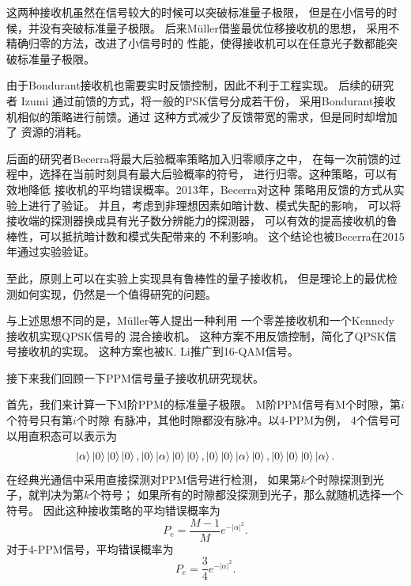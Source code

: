 这两种接收机虽然在信号较大的时候可以突破标准量子极限，
但是在小信号的时候，并没有突破标准量子极限。
后来M{\"u}ller借鉴最优位移接收机的思想，
采用不精确归零的方法，改进了小信号时的
性能，使得接收机可以在任意光子数都能突破标准量子极限\cite{muller2014qpsk,muller2014m}。

由于Bondurant接收机也需要实时反馈控制，因此不利于工程实现。
后续的研究者 Izumi 通过前馈的方式，将一般的PSK信号分成若干份，
采用Bondurant接收机相似的策略进行前馈\cite{izumi2012displacement}。通过
这种方式减少了反馈带宽的需求，但是同时却增加了
资源的消耗。

后面的研究者Becerra将最大后验概率策略加入归零顺序之中，
在每一次前馈的过程中，选择在当前时刻具有最大后验概率的符号，
进行归零\cite{becerra2011m}。这种策略，可以有效地降低
接收机的平均错误概率。2013年，Becerra对这种
策略用反馈的方式从实验上进行了验证\cite{becerra2013experimental}。
并且，考虑到非理想因素如暗计数、模式失配的影响，
可以将接收端的探测器换成具有光子数分辨能力的探测器，
可以有效的提高接收机的鲁棒性，可以抵抗暗计数和模式失配带来的
不利影响\cite{izumi2013quantum,li2013suppressing}。
这个结论也被Becerra在2015年通过实验验证\cite{becerra2015photon}。

至此，原则上可以在实验上实现具有鲁棒性的量子接收机，
但是理论上的最优检测如何实现，仍然是一个值得研究的问题。

与上述思想不同的是，M{\"u}ller等人提出一种利用
一个零差接收机和一个Kennedy接收机实现QPSK信号的
混合接收机\cite{muller2012quadrature}。
这种方案不用反馈控制，简化了QPSK信号接收机的实现。
这种方案也被K. Li推广到16-QAM信号\cite{李科2014}。

接下来我们回顾一下PPM信号量子接收机研究现状。

首先，我们来计算一下M阶PPM的标准量子极限。
M阶PPM信号有M个时隙，第$i$个符号只有第$i$个时隙
有脉冲，其他时隙都没有脉冲。以4-PPM为例，
4个信号可以用直积态可以表示为
\begin{equation}
\ket{\alpha}\ket{0}\ket{0}\ket{0}, \ket{0}\ket{\alpha}\ket{0}\ket{0},\ket{0}\ket{0}\ket{\alpha}\ket{0}, \ket{0}\ket{0}\ket{0}\ket{\alpha}.
\end{equation}
在经典光通信中采用直接探测对PPM信号进行检测，
如果第$k$个时隙探测到光子，就判决为第$k$个符号；
如果所有的时隙都没探测到光子，那么就随机选择一个符号。
因此这种接收策略的平均错误概率为
\begin{equation}
P_e = \frac{M-1}{M} e^{-|\alpha|^2}.
\end{equation}
对于4-PPM信号，平均错误概率为
\begin{equation}
P_e = \frac{3}{4} e^{-|\alpha|^2}.
\end{equation}

